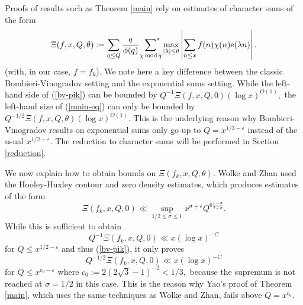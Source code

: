 \documentclass{article}
\newcommand{\Mod}{\,\mathrm{mod}\,}
\newcommand{\e}{\mathrm{e}}
\newcommand{\eps}{\varepsilon}
\newcommand{\starsum}{\ \sideset{}{^*}\sum}
\begin{document}
Proofs of results such as Theorem \ref{main} rely on estimates of character sums of the form 
\begin{equation}
    \Xi(f, x, Q, \theta) := \sum_{q\le Q} \frac{q}{\phi(q)} \starsum_{\chi \Mod q} \max_{|\lambda|\le\theta} \left|\sum_{n\le x} f(n)\chi(n) \e(\lambda n)\right|.
\end{equation}
(with, in our case, $f = f_k$).
We note here a key difference between the classic Bombieri-Vinogradov setting and the exponential sums setting. While the left-hand side of (\ref{bv-pik}) can be bounded by $Q^{-1}\Xi(f, x, Q,0) (\log x)^{O(1)},$ the left-hand size of (\ref{main-eq}) can only be bounded by $Q^{-1/2} \Xi(f, x, Q,\theta) (\log x)^{O(1)}.$ This is the underlying reason why Bombieri-Vinogradov results on exponential sums only go up to $Q = x^{1/3 - \eps}$ instead of the usual $x^{1/2 - \eps}.$ The reduction to character sums will be performed in Section \ref{reduction}.

We now explain how to obtain bounds on $\Xi(f_k, x, Q,\theta).$ Wolke and Zhan used the Hooley-Huxley contour and zero density estimates, which produces estimates of the form $$\Xi(f_k, x, Q,0) \ll \sup_{1/2\le \sigma\le 1} x^{\sigma+\eps}Q^{6\frac{1-\sigma}{2-\sigma}}.$$
While this is sufficient to obtain $$Q^{-1}\Xi(f_k, x, Q,0) \ll x(\log x)^{-C}$$ for $Q \le x^{1/2-\eps}$ and thus (\ref{bv-pik}), it only proves $$Q^{-1/2}\Xi(f_k, x, Q,0) \ll x(\log x)^{-C}$$ for $Q\le x^{c_0 - \eps}$ where $c_0 := 2\left(2\sqrt{3} - 1\right)^{-2} < 1/3,$ because the supremum is not reached at $\sigma = 1/2$ in this case. This is the reason why Yao's proof of Theorem \ref{main}, which uses the same techniques as Wolke and Zhan, fails above $Q = x^{c_0}.$
\end{document}
